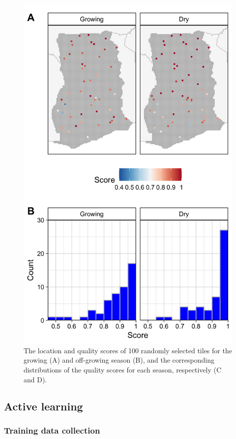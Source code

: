\documentclass[11pt,a4paper]{article}
\begin{document}
\begin{figure}

{\centering \includegraphics[width=0.7\linewidth]{figures/figure4} 

}

\caption{The location and quality scores of 100 randomly selected tiles for the growing (A) and off-growing season (B), and the corresponding distributions of the quality scores for each season, respectively (C and D).}\label{fig:imqual}
\end{figure}

\hypertarget{active-learning}{%
\subsection{Active learning}\label{active-learning}}

\hypertarget{training-data-collection}{%
\subsubsection{Training data
collection}\label{training-data-collection}}
\end{document}
